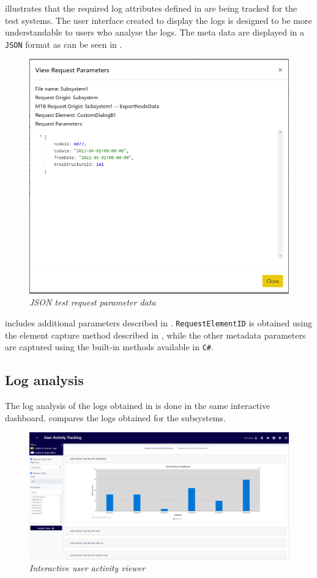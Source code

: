  illustrates that the required log attributes defined in  are being tracked for the test systems. The user interface created to display the logs is designed to be more understandable to users who analyse the logs. The meta data are displayed in a \texttt{JSON} format as can be seen in .

\clearpage

\begin{figure}[!htb]
	\centering %
	\includegraphics[width=0.6\linewidth]{img/ch3/analysis/UAT_request_params.png}
	\caption[JSON test request parameter data]
	{\textit{JSON test request parameter data}}\label{fig:ch3_JSON_Test_Result}
\end{figure}

 includes additional parameters described in . \texttt{RequestElementID} is obtained using the element capture method described in , while the other metadata parameters are captured using the built-in methods available in \texttt{C\#}.

\subsection{Log analysis}
The log analysis of the logs obtained in  is done in the same interactive dashboard.  compares the logs obtained for the subsystems.

\begin{figure}[!htb]
	\centering %
	\includegraphics[width=0.99\linewidth]{img/ch3/analysis/UAT_menu_analysis.png}
	\caption[Interactive user activity viewer]
	{\textit{Interactive user activity viewer}}\label{fig:ch3_UAT_menuAnalysis}
\end{figure}

